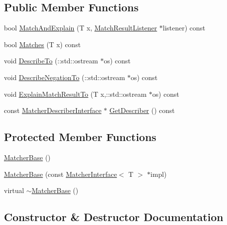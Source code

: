 \subsection*{Public Member Functions}
\begin{DoxyCompactItemize}
\item 
bool \hyperlink{classtesting_1_1internal_1_1_matcher_base_ae3f5f3150a95cafb1c2ab7c864a42e65}{Match\+And\+Explain} (T x, \hyperlink{classtesting_1_1_match_result_listener}{Match\+Result\+Listener} $\ast$listener) const 
\item 
bool \hyperlink{classtesting_1_1internal_1_1_matcher_base_a105a9dae7afecee8898db8ad1887b0db}{Matches} (T x) const 
\item 
void \hyperlink{classtesting_1_1internal_1_1_matcher_base_afcb24e7d1ff27e147e0e607d2a122467}{Describe\+To} (\+::std\+::ostream $\ast$os) const 
\item 
void \hyperlink{classtesting_1_1internal_1_1_matcher_base_a47cc840bc783fc0ceafbfb68d0ea5758}{Describe\+Negation\+To} (\+::std\+::ostream $\ast$os) const 
\item 
void \hyperlink{classtesting_1_1internal_1_1_matcher_base_a3a4c25a6e6c658b1fd52fd42c2fbd690}{Explain\+Match\+Result\+To} (T x,\+::std\+::ostream $\ast$os) const 
\item 
const \hyperlink{classtesting_1_1_matcher_describer_interface}{Matcher\+Describer\+Interface} $\ast$ \hyperlink{classtesting_1_1internal_1_1_matcher_base_a716ce3d9f89cb63f9911d56f307b6ff6}{Get\+Describer} () const 
\end{DoxyCompactItemize}
\subsection*{Protected Member Functions}
\begin{DoxyCompactItemize}
\item 
\hyperlink{classtesting_1_1internal_1_1_matcher_base_a7214ff6bbe5d13d5ee01fc09c7114e1d}{Matcher\+Base} ()
\item 
\hyperlink{classtesting_1_1internal_1_1_matcher_base_aed3e080f12ea7bde535ddf02b6f66922}{Matcher\+Base} (const \hyperlink{classtesting_1_1_matcher_interface}{Matcher\+Interface}$<$ T $>$ $\ast$impl)
\item 
virtual \hyperlink{classtesting_1_1internal_1_1_matcher_base_a6f8cbfaa5fa9205f297d84fb1741d9c3}{$\sim$\+Matcher\+Base} ()
\end{DoxyCompactItemize}


\subsection{Constructor \& Destructor Documentation}

